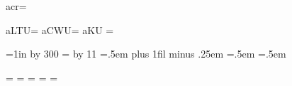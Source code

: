  



\let\!tacr=\\ %


\newdimen\LineThicknessUnit 
\newdimen\StrutUnit            
\newskip \InterColumnSpaceUnit  
\newdimen\ColumnWidthUnit     
\newdimen\KernUnit

\let\!taLTU=\LineThicknessUnit %
\let\!taCWU=\ColumnWidthUnit   %
\let\!taKU =\KernUnit          %

\newtoks\NormalTLTU
\newtoks\NormalTSU
\newtoks\NormalTICSU
\newtoks\NormalTCWU
\newtoks\NormalTKU

\NormalTLTU={1in \divide \LineThicknessUnit by 300 }
\NormalTSU ={\normalbaselineskip
  \divide \StrutUnit by 11 }  %
\NormalTICSU={.5em plus 1fil minus .25em}  %
\NormalTCWU ={.5em}
\NormalTKU  ={.5em}

\def\NormalTableUnits{%
  \LineThicknessUnit   =\the\NormalTLTU
  \StrutUnit           =\the\NormalTSU
  \InterColumnSpaceUnit=\the\NormalTICSU
  \ColumnWidthUnit     =\the\NormalTCWU
  \KernUnit            =\the\NormalTKU}
 
\NormalTableUnits



